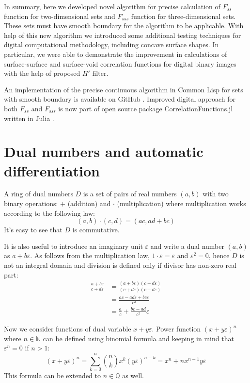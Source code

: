 \documentclass[1p]{elsarticle}
\begin{document}
In summary, here we developed novel algorithm for precise calculation of
$F_{ss}$ function for two-dimensional sets and $F_{sss}$ function for
three-dimensional sets. These sets must have smooth boundary for the algorithm
to be applicable. With help of this new algorithm we introduced some additional
testing techniques for digital computational methodology, including concave
surface shapes.  In particular, we were able to demonstrate the improvement in
calculations of surface-surface and surface-void correlation functions for
digital binary images with the help of proposed $H'$ filter.

An implementation of the precise continuous algorithm in Common Lisp for sets
with smooth boundary is available on GitHub
\cite{diff-boundary-corrfn}. Improved digital approach for both $F_{ss}$ and
$F_{sss}$ is now part of open source package CorrelationFunctions.jl written in
Julia \cite{CFs.jl}.

\appendix
\section{Dual numbers and automatic differentiation}
\label{sec:dual}
A ring of dual numbers $D$ is a set of pairs of real numbers $(a, b)$ with two
binary operations: $+$ (addition) and $\cdot$ (multiplication) where
multiplication works according to the following law:
\begin{equation}
  (a, b)\cdot(c, d) = (ac, ad + bc)
\end{equation}
It's easy to see that $D$ is commutative.

It is also useful to introduce an imaginary unit $\varepsilon$ and write a dual
number $(a, b)$ as $a + b\varepsilon$. As follows from the multiplication law,
$1\cdot \varepsilon = \varepsilon$ and $\varepsilon^2 = 0$, hence $D$ is not an
integral domain and division is defined only if divisor has non-zero real part:
\begin{equation}
  \begin{aligned}
    \frac{a+b\varepsilon}{c+d\varepsilon} &=
    \frac{(a+b\varepsilon)(c-d\varepsilon)}{(c+d\varepsilon)(c-d\varepsilon)} \\
    &= \frac{ac-ad\varepsilon+bc\varepsilon}{c^2} \\
    &= \frac{a}{c} + \frac{bc-ad}{c^2}\varepsilon
  \end{aligned}
\end{equation}

Now we consider functions of dual variable $x + y\varepsilon$. Power function
$(x + y\varepsilon)^n$ where $n \in \mathbb{N}$ can be defined using binomial
formula and keeping in mind that $\varepsilon^n = 0$ if $n>1$:
\begin{equation}
  (x + y\varepsilon)^n = \sum_{k=0}^n \binom{n}{k} x^k (y\varepsilon)^{n-k} =
  x^n + n x^{n-1} y \varepsilon
\end{equation}
This formula can be extended to $n \in \mathbb{Q}$ as well.
\end{document}
